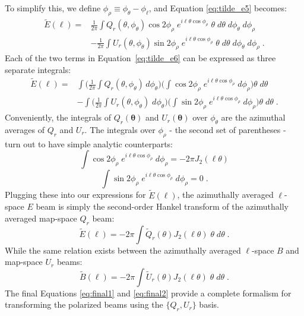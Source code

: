To simplify this, we define $\phi_{\rho} \equiv \phi_{\theta} - \phi_{\ell}$, and Equation \ref{eq:tilde_e5} becomes:
\begin{equation} \label{eq:tilde_e6}
\begin{split}
    \tilde{E}(\ell) = & \frac{1}{2\pi} \int Q_r(\theta,\phi_{\theta})\cos 2\phi_{\rho}\;e^{i\ell\theta\cos\phi_{\rho}}\;\theta\;d\theta\;d\phi_{\theta}\;d\phi_{\rho}\\ &
    - \frac{1}{2\pi} \int U_r(\theta,\phi_{\theta})\sin 2\phi_{\rho}\;e^{i\ell\theta\cos\phi_{\rho}}\;\theta\;d\theta\;d\phi_{\theta}\;d\phi_{\rho}\; .
\end{split}
\end{equation}
Each of the two terms in Equation~\ref{eq:tilde_e6} can be expressed as three separate integrals:
\begin{equation} \label{eq:sep_int}
\begin{split}
    \tilde{E}(\ell) = & \int \big(\frac{1}{2\pi} \int Q_r(\theta,\phi_{\theta})\,d\phi_{\theta}\big) \big(\int \cos 2\phi_{\rho}\;e^{i\ell\theta\cos\phi_{\rho}}\;d\phi_{\rho}\big) \theta\;d\theta \\ & - \int \big(\frac{1}{2\pi} \int U_r(\theta,\phi_{\theta})\;d\phi_{\theta}\big) \big(\int \sin 2\phi_{\rho}\;e^{i\ell\theta\cos\phi_{\rho}}\;d\phi_{\rho}\big) \theta\;d\theta \; .
\end{split}
\end{equation}
Conveniently, the integrals of $Q_r(\boldsymbol{\theta})$ and $U_r(\boldsymbol{\theta})$ over $\phi_{\theta}$ are the azimuthal averages of $Q_r$ and $U_r$.  The integrals over $\phi_{\rho}$ - the second set of parentheses - turn out to have simple analytic counterparts:
\begin{equation}
    \int \cos 2\phi_{\rho}\;e^{i\ell\theta\cos\phi_{\rho}}\;d\phi_{\rho} = -2\pi J_2(\ell\theta)
\end{equation}
\begin{equation}
    \int \sin 2\phi_{\rho}\;e^{i\ell\theta\cos\phi_{\rho}}\;d\phi_{\rho} = 0 \; .
\end{equation}
Plugging these into our expressions for $\tilde{E}(\ell)$, the azimuthally averaged $\ell$-space $E$ beam is simply the second-order Hankel transform of the azimuthally averaged map-space $Q_r$ beam:
\begin{equation} \label{eq:final1}
    \tilde{E}(\ell) = -2\pi\int \tilde{Q}_r(\theta) J_2(\ell\theta)\;\theta\;d\theta \; .
\end{equation}
While the same relation exists between the azimuthally averaged $\ell$-space $B$ and map-space $U_r$ beams:
\begin{equation} \label{eq:final2}
    \tilde{B}(\ell) = -2\pi\int \tilde{U}_r(\theta) J_2(\ell\theta)\;\theta\;d\theta \; .
\end{equation}
The final Equations \ref{eq:final1} and \ref{eq:final2} provide a complete formalism for transforming the polarized beams using the $\{Q_r,U_r\}$ basis.

